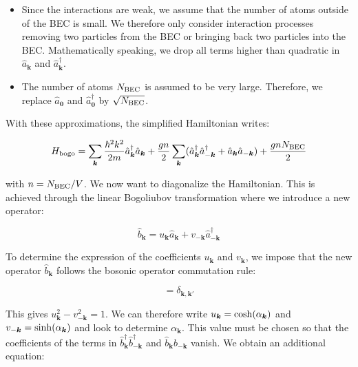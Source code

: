 \begin{itemize}
    \item Since the interactions are weak, we assume that the number of atoms outside of the BEC is small. We therefore only consider interaction processes removing two particles from the BEC or bringing back two particles into the BEC. Mathematically speaking, we drop all terms higher than quadratic in $\hat{a}_{\bm{k}}$ and $\hat{a}^{\dagger}_{\bm{k}}$.
    \item The number of atoms $N_{\rm{BEC}}$ is assumed to be very large. Therefore, we replace $\hat{a}_{\bm{0}}$ and $\hat{a}^{\dagger}_{\bm{0}}$ by $\sqrt{N_{\rm{BEC}}}$. 
\end{itemize}

\noindent With these approximations, the simplified Hamiltonian writes:

\begin{equation}
    H_{\rm{bogo}}=\sum_{\bm{k}}\frac{\hbar^2 k^2}{2m} \hat{a}^{\dagger}_{\bm{k}}  \hat{a}_{\bm{k}} +  \frac{gn}{2} \sum_{\bm{k}} (\hat{a}^{\dagger}_{\bm{k}} \hat{a}^{\dagger}_{-\bm{k}} +\hat{a}_{\bm{k}} \hat{a}_{-\bm{k}})+\frac{gnN_{\rm{BEC}}}{2}
\end{equation}

\noindent with $n=N_{\rm{BEC}}/V$. We now want to diagonalize the Hamiltonian. This is achieved through the linear Bogoliubov transformation where we introduce a new operator:

\begin{equation}
    \hat{b}_{\bm{k}}=u_{\bm{k}} \hat{a}_{\bm{k}} + v_{-\bm{k}} \hat{a}^{\dagger}_{-\bm{k}}
\end{equation}

\noindent To determine the expression of the coefficients $u_{\bm{k}}$ and $v_{\bm{k}}$, we impose that the new operator $\hat{b}_{\bm{k}}$ follows the bosonic operator commutation rule:

\begin{equation}
    [\hat{b}_{\bm{k}},\hat{b}^{\dagger}_{\bm{k}'}]= \delta_{\bm{k},\bm{k}'}
\end{equation}

\noindent This gives $u_{\bm{k}}^2 -  v_{-\bm{k}}^2 =1$. We can therefore write $u_{\bm{k}}={\rm cosh}(\alpha_{\bm{k}})$ and $v_{-\bm{k}}={\rm sinh}(\alpha_{\bm{k}})$ and look to determine $\alpha_{\bm{k}}$. This value must be chosen so that the coefficients of the terms in $\hat{b}^{\dagger}_{\bm{k}} \hat{b}^{\dagger}_{-\bm{k}}$ and $\hat{b}_{\bm{k}} \hat{b}_{-\bm{k}}$ vanish. We obtain an additional equation:


